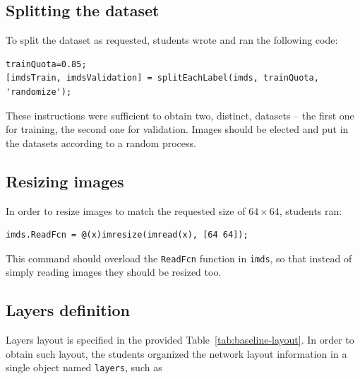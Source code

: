 \documentclass[a4paper, 11pt]{article} %
\begin{document}
\subsection{Splitting the dataset}

To split the dataset as requested, students wrote and ran the following code:

\begin{lstlisting}
trainQuota=0.85;
[imdsTrain, imdsValidation] = splitEachLabel(imds, trainQuota, 'randomize');
\end{lstlisting}

These instructions were sufficient to obtain two, distinct, datasets \--- the first one for training, the second one for validation. Images should be elected and put in the datasets according to a random process.

\subsection{Resizing images}

In order to resize images to match the requested size of $64 \times 64$, students ran:

\begin{lstlisting} 
imds.ReadFcn = @(x)imresize(imread(x), [64 64]);
\end{lstlisting}

This command should overload the \texttt{ReadFcn} function in \texttt{imds}, so that instead of simply reading images they should be resized too.

\subsection{Layers definition}

Layers layout is specified in the provided Table~\ref{tab:baseline-layout}. In order to obtain such layout, the students organized the network layout information in a single object named \texttt{layers}, such as
\end{document}
